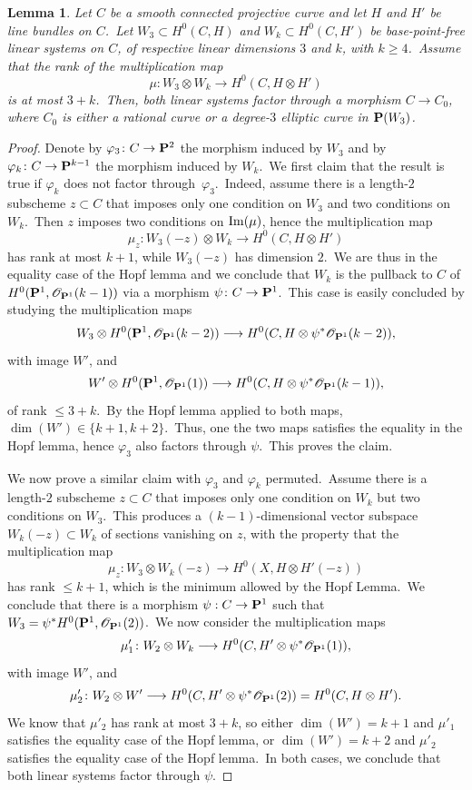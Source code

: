 \documentclass[12pt]{amsart}
\def\cO{\mathscr{O}}
\def\P{{\bf P}}
\def\phi{\varphi}
\def\Im{\mathop{\rm Im}\nolimits}
\def\lra{\longrightarrow}
\newtheorem{lemm}{Lemma}[section]
\theoremstyle{remark}
\begin{document}
\begin{lemm}\label{lepourconcprop72}
Let $C$ be a smooth connected projective curve and let $H$ and $H'$ be  line bundles on $C$.\ Let
$W_3\subset H^0(C,H)$ and $W_k\subset H^0(C,H')$ be  base-point-free linear systems on $C$, of respective linear dimensions $3$ and $k$, with $k\geq 4$.\
Assume that the rank of the multiplication map
$$\mu\colon W_3\otimes W_k\lra H^0(C,H\otimes H')$$
is at most $3+k$.\ Then, both linear systems factor through a morphism $C\to C_0$, where $C_0$ is either a  rational curve or a degree-$3$ elliptic curve in $\P(W_3)$.
\end{lemm}

\begin{proof} Denote by $\phi_3\colon C\to \P^2$   the morphism  induced by $W_3$ and by
$\phi_k\colon C\to \P^{k-1}$ the morphism  induced by $W_k$.\   We first claim that the result is true if  $\phi_{k}$ does not factor through~$\phi_3$.\ Indeed, assume there is a length-$2$ subscheme
$z\subset C$ that imposes only one  condition on $W_3$ and two conditions on $W_k$.\ Then
$z$ imposes two conditions on $\Im(\mu)$, hence the multiplication map
$$\mu_z\colon W_3(-z)\otimes W_k\lra   H^0(C, H\otimes H')$$
has rank at most $k+1$, while $W_3(-z)$ has dimension $2$.\ We are thus in the  equality case of the Hopf lemma  and we conclude that $W_k$ is the pullback to $C$ of $H^0(\P^1,\cO_{\P^1}(k-1))$ via a morphism
$\psi\colon C\to  \P^1$.\ This case is easily concluded by studying  the
multiplication maps
$$W_3\otimes H^0(\P^1,\cO_{\P^1}(k-2))\lra H^0(C,H\otimes \psi^*\cO_{\P^1}(k-2)),$$
 with image $W'$, and
$$W'\otimes H^0(\P^1,\cO_{\P^1}(1))\lra H^0(C,H\otimes \psi^*\cO_{\P^1}(k-1)), $$
of rank $\leq 3+k$.\
By the Hopf lemma applied to both maps,   $\dim (W')\in\{k+1,k+2\}$.\ Thus, one the two maps  satisfies  the equality in the Hopf lemma, hence    $\phi_3$ also factors through $\psi$.\ This proves the  claim.

We now prove a similar claim with $\phi_3$ and $\phi_{k}$ permuted.\ Assume  there is a length-$2$ subscheme $z\subset C$ that imposes only one condition on $W_k$ but two conditions on $W_3$.\ This produces a $(k-1)$-dimensional vector subspace $W_{k}(-z)\subset W_k$ of sections vanishing on $z$, with the property that the multiplication map
$$\mu_z\colon W_3\otimes W_{k}(-z)\lra H^0(X,H\otimes  H'(-z))$$
has rank $\leq k+1$, which is the minimum allowed by the Hopf Lemma.\ We conclude that there is a morphism $\psi:C\rightarrow \P^1$ such that $W_3=\psi^*H^0(\P^1,\cO_{\P^1}(2))$.\
We now consider the   multiplication maps
$$\mu'_1\colon  W_2\otimes  W_k\lra H^0(C, H'\otimes \psi^* \cO_{\P^1}(1)),$$
with image $W'$, and
$$ \mu'_2\colon W_2\otimes  W'\lra H^0(C, H'\otimes \psi^* \cO_{\P^1}(2))=H^0(C,H\otimes H').$$
We know that  $\mu'_2$ has rank at most $3+k$, so either $\dim (W')=k+1$ and $\mu'_1$ satisfies  the equality case of  the Hopf lemma, or
$\dim (W')=k+2$ and  $\mu'_2$ satisfies  the equality case of  the Hopf lemma.\ In both cases, we conclude that both linear systems factor through $\psi$.


\end{proof}
\end{document}
